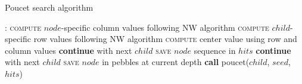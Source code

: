 \documentclass[10pt,onecolumn]{article}
\begin{document}
\begin{algorithm}
  \caption{Poucet search algorithm}
  \label{alg:poucet}
  \begin{algorithmic}[1]
    :
    \State \textsc{compute} $node$-specific column values following NW
    algorithm 
    \State \textsc{compute} $child$-specific row values following NW
    algorithm 
    \State \textsc{compute} center value using row and column values 
     
    \State \textbf{continue} with next $child$
    \EndIf
     
    \State \textsc{save} $node$ sequence in $hits$
    \State \textbf{continue} with next $child$
    \EndIf
    \State \textsc{save} $node$ in pebbles at current depth
    \EndIf
    \State \textbf{call} poucet($child$, $seed$, $hits$)
    \EndFor
    \EndProcedure
  \end{algorithmic}
\end{algorithm}
\end{document}
